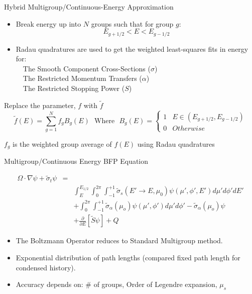 \documentclass{beamer}
\begin{document}
\begin{frame}{Hybrid Multigroup/Continuous-Energy Approximation}
 
  \begin{itemize}

    \item Break energy up into $N$ groups such that for group $g$:
    $$ E_{g+1/2} < E < E_{g-1/2} $$ 
    
    \item Radau quadratures are used to get the weighted least-squares fits in energy for: \\~~The Smooth Component Cross-Sections ($\sigma$)
\\~~The Restricted Momentum Transfers ($\alpha$)
\\~~The Restricted Stopping Power ($S$)
    
  \end{itemize}
  
   Replace the parameter, $f$ with $\tilde f$ \\
\[
\tilde{f}(E)=\sum_{g=1}^{N}f_gB_g(E)
~~~\text{Where}~~~  B_g(E) =
\begin{cases} 
1 & E \in (E_{g+1/2},E_{g-1/2}) \\ 
0 & Otherwise
\end{cases}
\] 

   $f_g$ is the weighted group average of $f(E)$ using Radau quadratures

\end{frame}

\begin{frame}{Multigroup/Continuous Energy BFP Equation}
 
    \begin{eqnarray*}
      \Omega \cdot \nabla \psi + \tilde{\sigma}_t\psi &= & \\
      & & \int_{E}^{E_{1/2}}\int_{0}^{2\pi}\int_{-1}^{+1} \tilde{\sigma}_s(E'\rightarrow E,\mu_0)
       \psi(\mu',\phi',E')d\mu'd\phi'dE' \\
       & &+ \int_{0}^{2\pi}\int_{-1}^{+1} \tilde{\sigma}_{\alpha}(\mu_o) \psi(\mu',\phi')d\mu'd\phi'  - \tilde{\sigma}_{\alpha}(\mu_o)\psi\\
       & &+ \frac{\partial}{\partial E} [\tilde{S}\psi] + Q
    \end{eqnarray*}

     \begin{itemize}
       \item The Boltzmann Operator reduces to Standard Multigroup method.

      \item Exponential distribution of path lengths (compared fixed path length for condensed history).
   
      \item Accuracy depends on:  \# of groups, Order of Legendre expansion, $\mu_s$
       
     \end{itemize}

\end{frame}
\end{document}

